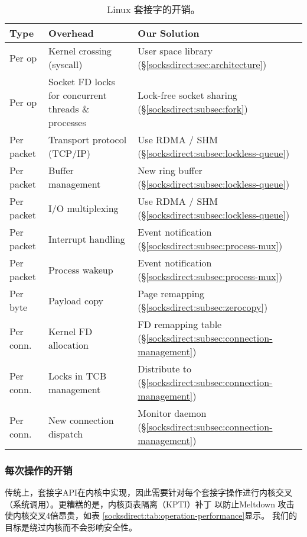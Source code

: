 \begin{table}[t]
	\centering
		\begin{tabularx}{1\textwidth}{l|X|X}
			\hline
			Type & Overhead & Our Solution \\
			\hline
			\hline
			Per op & Kernel crossing (syscall) & User space library (\S\ref{socksdirect:sec:architecture}) \\
			\hline
			Per op & Socket FD locks for concurrent threads \& processes & Lock-free socket sharing (\S\ref{socksdirect:subsec:fork}) \\
			\hline
			\hline
			Per packet & Transport protocol (TCP/IP) & Use RDMA / SHM (\S\ref{socksdirect:subsec:lockless-queue}) \\
			\hline
			Per packet & Buffer management & New ring buffer (\S\ref{socksdirect:subsec:lockless-queue}) \\
			\hline
			Per packet & I/O multiplexing & Use RDMA / SHM (\S\ref{socksdirect:subsec:lockless-queue}) \\
			\hline
			Per packet & Interrupt handling & Event notification (\S\ref{socksdirect:subsec:process-mux}) \\
			\hline
			Per packet & Process wakeup & Event notification (\S\ref{socksdirect:subsec:process-mux}) \\
			\hline
			\hline
			Per byte & Payload copy & Page remapping (\S\ref{socksdirect:subsec:zerocopy}) \\
			\hline
			\hline
			Per conn. & Kernel FD allocation & FD remapping table (\S\ref{socksdirect:subsec:connection-management}) \\
			\hline
			Per conn. & Locks in TCB management & Distribute to \libipc{} (\S\ref{socksdirect:subsec:connection-management}) \\
			\hline
			Per conn. & New connection dispatch & Monitor daemon (\S\ref{socksdirect:subsec:connection-management}) \\
			\hline
		\end{tabularx}
	\caption{Linux 套接字的开销。}
	\label{socksdirect:tab:overhead}
	
\end{table}

\subsubsection{每次操作的开销}
\label{socksdirect:subsec:per-operation-overhead}
\quad

传统上，套接字API在内核中实现，因此需要针对每个套接字操作进行内核交叉（系统调用）。更糟糕的是，内核页表隔离（KPTI）补丁 \cite {kpti}以防止Meltdown \cite {Lipp2018meltdown}攻击使内核交叉4倍昂贵，如表 \ref {socksdirect:tab:operation-performance}显示。
我们的目标是绕过内核而不会影响安全性。

